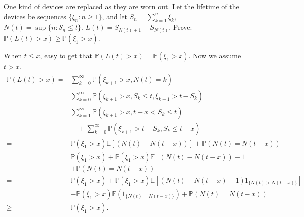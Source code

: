 \documentclass[../main]{subfiles}
\begin{document}
\begin{problem}\label{pro:4}
  One kind of devices are replaced as they are worn out.
  Let the lifetime of the devices be sequences
  \(\{\xi_n:n \geq 1\}\), and let \(S_n=\sum_{k=1}^{n} \xi_k\), \(N(t)=\sup \{n: S_n \leq t\}\). \(L(t)=S_{N(t) + 1}-S_{N(t)}\).
  Prove: \(\mathbb{P}(L(t)> x) \geq \mathbb{P}(\xi_1 > x)\).
\end{problem}
\begin{solution}
  When \(t \leq x\), easy to get that \(\mathbb{P}(L(t)>x)=\mathbb{P}(\xi_1>x)\).
  Now we assume \(t > x\).
  \begin{equation}
    \begin{aligned}
      \mathbb{P}(L(t)>x)= & \sum_{k=0}^{\infty} \mathbb{P}\left(\xi_{k+1}>x, N(t)=k\right)                                                           \\
      =                   & \sum_{k=0}^{\infty} \mathbb{P}\left(\xi_{k+1}>x, S_k \leq t, \xi_{k+1}>t-S_k\right)                                      \\
      =                   & \sum_{k=1}^{\infty} \mathbb{P}\left(\xi_{k+1}>x, t-x<S_k \leq t\right)                                                   \\
                          & \quad+\sum_{k=0}^{\infty} \mathbb{P}\left(\xi_{k+1}>t-S_k, S_k \leq t-x\right)                                           \\
      =                   & \mathbb{P}\left(\xi_1>x\right) \mathbb{E}[(N(t)-N(t-x))]+\mathbb{P}(N(t)=N(t-x))                                         \\
      =                   & \mathbb{P}\left(\xi_1>x\right)+\mathbb{P}\left(\xi_1>x\right) \mathbb{E}[(N(t)-N(t-x))-1]                                \\
                          & +\mathbb{P}(N(t)=N(t-x))                                                                                                 \\
      =                   & \mathbb{P}\left(\xi_1>x\right)+\mathbb{P}\left(\xi_1>x\right) \mathbb{E}\left[(N(t)-N(t-x)-1) 1_{\{N(t)>N(t-x)\}}\right] \\
                          & -\mathbb{P}\left(\xi_1>x\right) \mathbb{E}\left(1_{\{N(t)=N(t-x)\}}\right)+\mathbb{P}(N(t)=N(t-x))                       \\
      \geq                & \mathbb{P}\left(\xi_1>x\right) .
    \end{aligned}
  \end{equation}
\end{solution}
\end{document}
